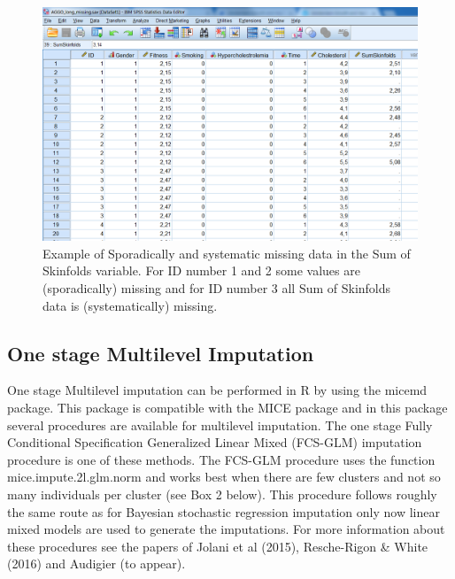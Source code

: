 \documentclass[]{book}
\begin{document}
\begin{figure}

{\centering \includegraphics[width=0.9\linewidth]{images/fig7.15} 

}

\caption{Example of Sporadically and systematic missing data in the Sum of Skinfolds variable. For ID number 1 and 2 some values are (sporadically) missing and for ID number 3 all Sum of Skinfolds data is (systematically) missing.}\label{fig:fig86}
\end{figure}

\subsection{One stage Multilevel
Imputation}\label{one-stage-multilevel-imputation-1}

One stage Multilevel imputation can be performed in R by using the
micemd package. This package is compatible with the MICE package and in
this package several procedures are available for multilevel imputation.
The one stage Fully Conditional Specification Generalized Linear Mixed
(FCS-GLM) imputation procedure is one of these methods. The FCS-GLM
procedure uses the function mice.impute.2l.glm.norm and works best when
there are few clusters and not so many individuals per cluster (see Box
2 below). This procedure follows roughly the same route as for Bayesian
stochastic regression imputation only now linear mixed models are used
to generate the imputations. For more information about these procedures
see the papers of Jolani et al (2015), Resche-Rigon \& White (2016) and
Audigier (to appear).
\end{document}
